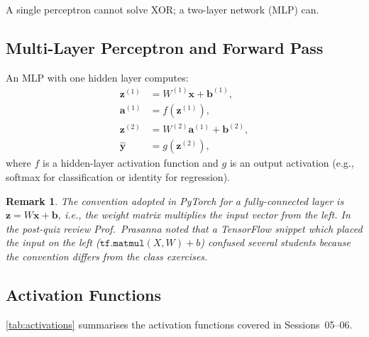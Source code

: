 \documentclass[12pt,a4paper]{article}
\newtheorem{remark}{Remark}[section]
\begin{document}
\noindent
A single perceptron cannot solve XOR; a two-layer network (MLP) can.

\subsection{Multi-Layer Perceptron and Forward Pass}
\label{ssec:mlp}

An MLP with one hidden layer computes:
\begin{align}
  \mathbf{z}^{(1)} &= W^{(1)}\mathbf{x} + \mathbf{b}^{(1)},
    \label{eq:z1} \\
  \mathbf{a}^{(1)} &= f\!\left(\mathbf{z}^{(1)}\right),
    \label{eq:a1} \\
  \mathbf{z}^{(2)} &= W^{(2)}\mathbf{a}^{(1)} + \mathbf{b}^{(2)},
    \label{eq:z2} \\
  \hat{\mathbf{y}} &= g\!\left(\mathbf{z}^{(2)}\right),
    \label{eq:yhat}
\end{align}
where $f$ is a hidden-layer activation function and $g$ is an output
activation (e.g., softmax for classification or identity for regression).

\begin{remark}
\label{rem:matrix_order}
The convention adopted in PyTorch for a \emph{fully-connected} layer is
$\mathbf{z} = W\mathbf{x} + \mathbf{b}$, i.e., the weight matrix
multiplies the input vector from the \emph{left}.  In the post-quiz
review Prof.\ Prasanna noted that a TensorFlow snippet which placed the
input on the left ($\mathtt{tf.matmul}(X, W) + b$) confused several
students because the convention differs from the class exercises.
\end{remark}

\subsection{Activation Functions}
\label{ssec:activations}

\cref{tab:activations} summarises the activation functions covered in
Sessions~05--06.
\end{document}
